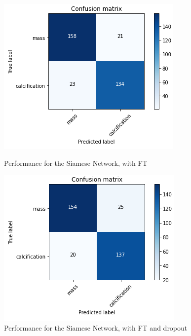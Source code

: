 \documentclass[11pt,a4paper,oneside]{article}
\begin{document}
\begin{figure}[h]
	\begin{minipage}[c]{.4\textwidth}
		\centering\setlength{\captionmargin}{0pt}%
		\includegraphics[width=.9\textwidth]{images/4.1/Siamese/Conf_MatrixFT}
		\caption{Performance for the Siamese Network, with FT}
		\label{fig:siamese_ft}
	\end{minipage}
	\hspace{5mm}%
	\begin{minipage}[c]{.4\textwidth}
		\centering\setlength{\captionmargin}{0pt}%
		\includegraphics[width=.9\textwidth]{images/4.1/Siamese/Conf_MatrixFT_drop}
		\caption{Performance for the Siamese Network, with FT and dropout}
		\label{fig:siamese_ft_drop}
	\end{minipage}
\end{figure}
\end{document}
